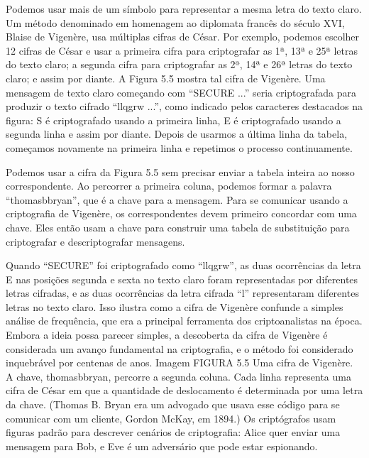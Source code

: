 \documentclass{book}
\begin{document}
Podemos usar mais de um símbolo para representar a mesma letra do texto claro. Um método denominado em homenagem ao diplomata francês do século XVI, Blaise de Vigenère, usa múltiplas cifras de César. Por exemplo, podemos escolher 12 cifras de César e usar a primeira cifra para criptografar as 1ª, 13ª e 25ª letras do texto claro; a segunda cifra para criptografar as 2ª, 14ª e 26ª letras do texto claro; e assim por diante. A Figura 5.5 mostra tal cifra de Vigenère. Uma mensagem de texto claro começando com ``SECURE ...'' seria criptografada para produzir o texto cifrado ``llqgrw ...'', como indicado pelos caracteres destacados na figura: S é criptografado usando a primeira linha, E é criptografado usando a segunda linha e assim por diante. Depois de usarmos a última linha da tabela, começamos novamente na primeira linha e repetimos o processo continuamente.

Podemos usar a cifra da Figura 5.5 sem precisar enviar a tabela inteira ao nosso correspondente. Ao percorrer a primeira coluna, podemos formar a palavra ``thomasbbryan'', que é a chave para a mensagem. Para se comunicar usando a criptografia de Vigenère, os correspondentes devem primeiro concordar com uma chave. Eles então usam a chave para construir uma tabela de substituição para criptografar e descriptografar mensagens.

Quando ``SECURE'' foi criptografado como ``llqgrw'', as duas ocorrências da letra E nas posições segunda e sexta no texto claro foram representadas por diferentes letras cifradas, e as duas ocorrências da letra cifrada ``l'' representaram diferentes letras no texto claro. Isso ilustra como a cifra de Vigenère confunde a simples análise de frequência, que era a principal ferramenta dos criptoanalistas na época. Embora a ideia possa parecer simples, a descoberta da cifra de Vigenère é considerada um avanço fundamental na criptografia, e o método foi considerado inquebrável por centenas de anos.
Imagem
FIGURA 5.5 Uma cifra de Vigenère. A chave, thomasbbryan, percorre a segunda coluna. Cada linha representa uma cifra de César em que a quantidade de deslocamento é determinada por uma letra da chave. (Thomas B. Bryan era um advogado que usava esse código para se comunicar com um cliente, Gordon McKay, em 1894.)
Os criptógrafos usam figuras padrão para descrever cenários de criptografia: Alice quer enviar uma mensagem para Bob, e Eve é um adversário que pode estar espionando.

\end{document}
